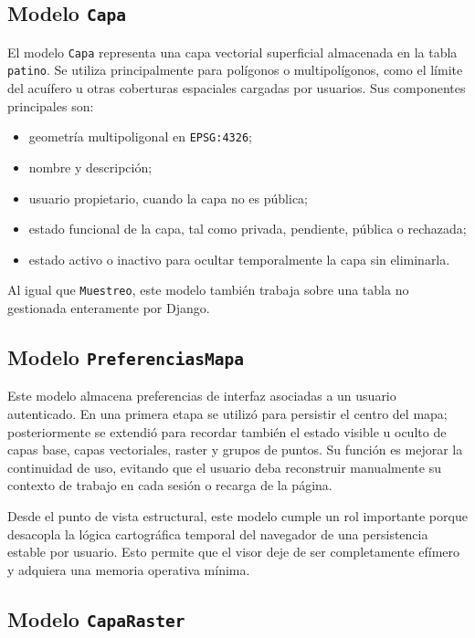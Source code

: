 \documentclass[12pt,a4paper]{report}
\begin{document}
\subsection{Modelo \texttt{Capa}}

El modelo \texttt{Capa} representa una capa vectorial superficial almacenada en la tabla \texttt{patino}. Se utiliza principalmente para pol\'igonos o multipol\'igonos, como el l\'imite del acu\'ifero u otras coberturas espaciales cargadas por usuarios. Sus componentes principales son:

\begin{itemize}
    \item geometr\'ia multipoligonal en \texttt{EPSG:4326};
    \item nombre y descripci\'on;
    \item usuario propietario, cuando la capa no es p\'ublica;
    \item estado funcional de la capa, tal como privada, pendiente, p\'ublica o rechazada;
    \item estado activo o inactivo para ocultar temporalmente la capa sin eliminarla.
\end{itemize}

Al igual que \texttt{Muestreo}, este modelo tambi\'en trabaja sobre una tabla no gestionada enteramente por Django.

\subsection{Modelo \texttt{PreferenciasMapa}}

Este modelo almacena preferencias de interfaz asociadas a un usuario autenticado. En una primera etapa se utiliz\'o para persistir el centro del mapa; posteriormente se extendi\'o para recordar tambi\'en el estado visible u oculto de capas base, capas vectoriales, raster y grupos de puntos. Su funci\'on es mejorar la continuidad de uso, evitando que el usuario deba reconstruir manualmente su contexto de trabajo en cada sesi\'on o recarga de la p\'agina.

Desde el punto de vista estructural, este modelo cumple un rol importante porque desacopla la l\'ogica cartogr\'afica temporal del navegador de una persistencia estable por usuario. Esto permite que el visor deje de ser completamente ef\'imero y adquiera una memoria operativa m\'inima.

\subsection{Modelo \texttt{CapaRaster}}
\end{document}
